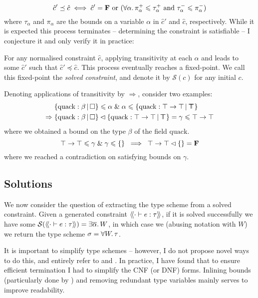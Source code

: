 $$ \hat c' \preceq \hat c \iff \hat c' = \mathbf F \text{ or } (\forall \alpha \ldotp \pi_\alpha^+ \leqslant \tau_\alpha^+ \text{ and } \tau_\alpha^- \leqslant \pi_\alpha^-) $$
where $\tau_\alpha$ and $\pi_\alpha$ are the bounds on a variable $\alpha$ in $\hat c'$ and $\hat c$, respectively.
While it is expected this process terminates \cite{pottier-framework, simple-sub, mlstruct} -- determining the constraint is satisfiable -- I conjecture it and only verify it in practice:
\begin{conjecture}
    For any normalised constraint $\hat c$, applying transitivity at each $\alpha$ and leads to some $\hat c'$ such that $\hat c' \preceq \hat c$. This process eventually reaches a fixed-point. We call this fixed-point the \emph{solved constraint}, and denote it by $\mathcal S(c)$ for any initial $c$.
\end{conjecture}

\begin{example}
    Denoting applications of transitivity by $\Rightarrow$, consider two examples:
    \begin{align*}
        & \flext{\mathrm{quack}: \beta}{\flabsent} \sub \alpha \und \alpha \sub \flext{\mathrm{quack}: \top \to \top }{\flftop} \\
        \Rightarrow\;& \flext{\mathrm{quack}: \beta}{\flabsent} \cdecomp \flext{\mathrm{quack}: \top \to \top }{\flftop} = \gamma \sub \top \to \top
    \end{align*}
    where we obtained a bound on the type $\beta$ of the field $\mathrm{quack}$.
    $$ \top \to \top \sub \gamma \und \gamma \sub \flrec{} \;\implies\; \top \to \top \cdecomp \flrec{} = \fals $$
    where we reached a contradiction on satisfying bounds on $\gamma$.
\end{example}

\subsection{Solutions}
\label{subsec:simplification}

We now consider the question of extracting the type scheme from a solved constraint. Given a generated constraint $\cstr{\cdot}{e}{\tau}$, if it is solved successfully we have some $\mathcal S \left( \cstr{\cdot}{e}{\tau} \right) = \exists \overline{\alpha} \ldotp \sbnd$, in which case we (abusing notation with $W$) we return the type scheme $\sigma =  \forall W \ldotp \tau$.

It is important to simplify type schemes -- however, I do not propose novel ways to do this, and entirely refer to \textcite{simple-sub} and \textcite{mlstruct}. In practice, I have found that to ensure efficient termination I had to simplify the CNF (or DNF) forms. Inlining bounds (particularly done by \textcite{dolan-thesis}) and removing redundant type variables mainly serves to improve readability.

